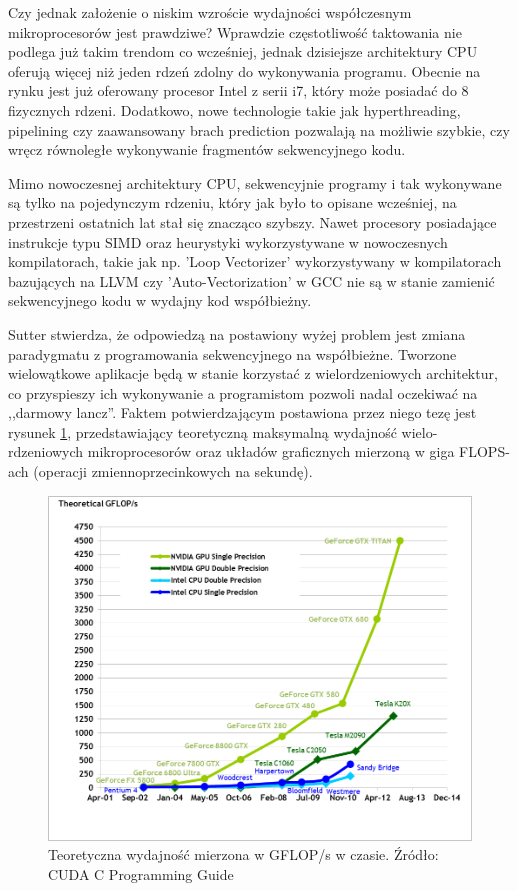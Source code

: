 Czy jednak założenie o niskim wzroście wydajności współczesnym mikroprocesorów
jest prawdziwe? Wprawdzie częstotliwość taktowania nie podlega już takim trendom
co wcześniej, jednak dzisiejsze architektury CPU oferują więcej niż jeden rdzeń
zdolny do wykonywania programu. Obecnie na rynku jest już oferowany procesor
Intel z serii i7, który może posiadać do 8 fizycznych rdzeni. Dodatkowo, nowe
technologie takie jak hyperthreading, pipelining czy zaawansowany brach
prediction pozwalają na możliwie szybkie, czy wręcz równoległe wykonywanie
fragmentów sekwencyjnego kodu.

Mimo nowoczesnej architektury CPU, sekwencyjnie programy i tak wykonywane są
tylko na pojedynczym rdzeniu\cite{massive}, który jak było to opisane wcześniej,
na przestrzeni ostatnich lat stał się znacząco szybszy. Nawet 
procesory posiadające instrukcje typu SIMD oraz heurystyki wykorzystywane w
nowoczesnych kompilatorach, takie jak np. 'Loop Vectorizer' wykorzystywany w
kompilatorach bazujących na LLVM \cite{llvm} czy 'Auto-Vectorization' w GCC
\cite{gcc} nie są w stanie zamienić sekwencyjnego kodu w wydajny kod
współbieżny.

Sutter stwierdza, że odpowiedzą na postawiony wyżej problem jest zmiana
paradygmatu z programowania sekwencyjnego na współbieżne. Tworzone wielowątkowe
aplikacje będą w stanie korzystać z wielordzeniowych architektur, co przyspieszy
ich wykonywanie a programistom pozwoli nadal oczekiwać na ,,darmowy lancz''.
Faktem potwierdzającym postawiona przez niego tezę jest rysunek \ref{gflops},
przedstawiający teoretyczną maksymalną wydajność wielo-rdzeniowych mikroprocesorów oraz układów
graficznych mierzoną w giga FLOPS-ach (operacji zmiennoprzecinkowych na
sekundę).

\begin{figure}[ht]
\centering
\includegraphics[scale=0.4]{images/floating-point-operations-per-second.png}
\caption{Teoretyczna wydajność mierzona w GFLOP/s w czasie. Źródło: CUDA C Programming Guide}
\label{gflops}
\end{figure}

